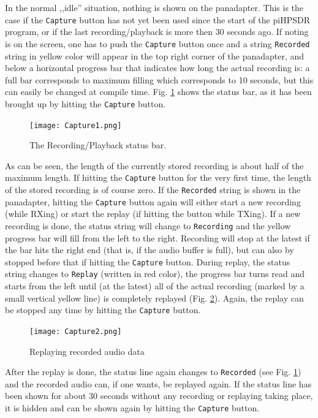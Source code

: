 \documentclass[12pt]{book}
\def\rett#1{\texttt{\color{red}#1}}
\def\bltt#1{\texttt{\color{blue}#1}}
\def\pH{pi\-HPSDR }
\begin{document}
In the normal ,,idle'' situation, nothing is shown on the panadapter. This is the case if the \bltt{Capture}
button has not yet been used since the start of the \pH program, or if the last recording/playback is
more then 30 seconds ago. If noting is on the screen, one has to push the \bltt{Capture} button once and
a string \rett{Recorded} string in yellow color will appear in the top right corner of the panadapter,
and below a horizontal progress bar that indicates how long the actual recording is: a full bar corresponds
to maximum filling which corresponds to 10 seconds, but this can easily be changed at compile time.
Fig. \ref{fig:capture1} shows the status bar, as it has been brought up by hitting the \bltt{Capture} button.

\begin{figure}[ht]
\center
\texttt{[image: Capture1.png]}
\caption{The Recording/Playback status bar.}
\label{fig:capture1}
\end{figure}

As can be seen, the length of the currently stored recording is about half of the maximum length. If hitting
the \bltt{Capture} button for the very first time, the length of the stored recording is of course zero. If
the \rett{Recorded} string is shown in the panadapter, hitting the \bltt{Capture} button again will either
start a new recording (while RXing) or start the replay (if hitting the button while TXing).
If a new recording is done, the status string will change to \rett{Recording} and the yellow progress bar
will fill from the left to the right. Recording will stop at the latest if the bar hits the right end
(that is, if the audio buffer is full), but can also by stopped before that if hitting the \bltt{Capture}
button. During replay, the status string changes to \rett{Replay} (written in red color), the progress bar
turns read and starts from the left until (at the latest) all of the actual recording (marked by a small
vertical yellow line) is completely replayed (Fig. \ref{fig:capture2}). Again, the replay can be stopped any time by hitting
the \bltt{Capture} button.
\begin{figure}[ht]
\center
\texttt{[image: Capture2.png]}
\caption{Replaying recorded audio data}
\label{fig:capture2}
\end{figure}

After the replay is done, the status line again changes to \rett{Recorded} (see Fig. \ref{fig:capture1})
and the recorded audio can, if one wants, be replayed again. If the status line has been shown for about
30 seconds without any recording or replaying taking place, it is hidden and can be shown again by
hitting the \bltt{Capture} button.
\end{document}
